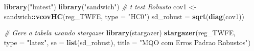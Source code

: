 \documentclass[portugues]{article}
\newenvironment{Shaded}{\begin{snugshade}}{\end{snugshade}}
\newcommand{\AttributeTok}[1]{\textcolor[rgb]{0.13,0.29,0.53}{#1}}
\newcommand{\CommentTok}[1]{\textcolor[rgb]{0.56,0.35,0.01}{\textit{#1}}}
\newcommand{\FunctionTok}[1]{\textcolor[rgb]{0.13,0.29,0.53}{\textbf{#1}}}
\newcommand{\NormalTok}[1]{#1}
\newcommand{\OtherTok}[1]{\textcolor[rgb]{0.56,0.35,0.01}{#1}}
\newcommand{\SpecialCharTok}[1]{\textcolor[rgb]{0.81,0.36,0.00}{\textbf{#1}}}
\newcommand{\StringTok}[1]{\textcolor[rgb]{0.31,0.60,0.02}{#1}}
\begin{document}
\begin{boxA}
\begin{Shaded}
\begin{Highlighting}[]
\FunctionTok{library}\NormalTok{(}\StringTok{"lmtest"}\NormalTok{)}
\FunctionTok{library}\NormalTok{(}\StringTok{"sandwich"}\NormalTok{)}
\CommentTok{\# t test Robusto}
\NormalTok{cov1 }\OtherTok{\textless{}{-}}\NormalTok{ sandwich}\SpecialCharTok{::}\FunctionTok{vcovHC}\NormalTok{(reg\_TWFE, }\AttributeTok{type =} \StringTok{"HC0"}\NormalTok{)}
\NormalTok{sd\_robust }\OtherTok{=} \FunctionTok{sqrt}\NormalTok{(}\FunctionTok{diag}\NormalTok{(cov1))}

\CommentTok{\# Gere a tabela usando stargazer}
\FunctionTok{library}\NormalTok{(stargazer)}
\FunctionTok{stargazer}\NormalTok{(reg\_TWFE, }\AttributeTok{type =} \StringTok{"latex"}\NormalTok{, }\AttributeTok{se =} \FunctionTok{list}\NormalTok{(sd\_robust),}
\AttributeTok{title =} \StringTok{"MQO com Erros Padrao Robustos"}\NormalTok{)}
\end{Highlighting}
\end{Shaded}


\end{boxA}
\end{document}
